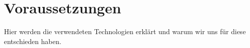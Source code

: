 \chapter{Voraussetzungen}
Hier werden die verwendeten Technologien erklärt und warum wir uns für diese entschieden haben.
